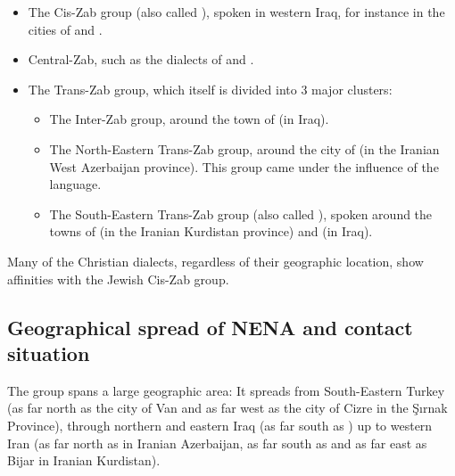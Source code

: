 \begin{itemize}
	\item  The Cis-Zab group (also called ), spoken in western Iraq, for instance in the cities of \JZax* and \Dohok.
	\item  Central-Zab, such as the dialects of \Sandu and \Barz.
	\item The Trans-Zab group, which  itself is divided into 3 major clusters:
	\begin{itemize}
		\item The Inter-Zab group, around the town of \Arb (in Iraq).
		\item  The North-Eastern Trans-Zab group, around the city of \JUrm* (in the Iranian West Azerbaijan province). This group came under the influence of the  language.
		\item The South-Eastern Trans-Zab group (also called  ), spoken around the towns of \JSan* (in the Iranian Kurdistan province) and \Khanaqin (in Iraq).
		
	\end{itemize}
\end{itemize} 

Many of the Christian dialects, regardless of their geographic location, show affinities with the Jewish Cis-Zab group.
		
	
\subsection{Geographical spread of NENA and contact situation}
	
	
	
The  group spans a large geographic area: It spreads from South-Eastern Turkey (as far north as the city of Van and as far west as the city of Cizre in the Şırnak Province), through northern and eastern Iraq (as far south as \Khanaqin) up to western Iran (as far north as \Salamas in Iranian Azerbaijan, as far south as \Ker and as far east as Bijar in Iranian Kurdistan).
	
